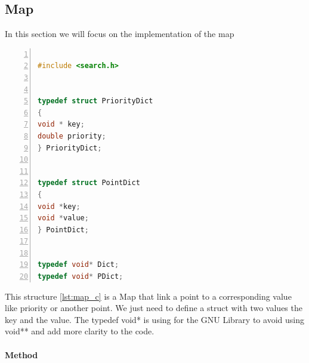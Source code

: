 \subsection{Map}
In this section we will focus on the implementation of the map

\begin{minipage}{\linewidth}
\begin{lstlisting}[language=C, % Spécifie le langage du code
caption={Map C implementation}, % Légende du listing
label=lst:map_c, % Étiquette pour référencer le listing
numbers=left,
numberstyle=\tiny\color{gray},
stepnumber=1,
frame=single,
breaklines=true,
postbreak=\mbox{\textcolor{red}{$\hookrightarrow$}\space},
showstringspaces=false
]

#include <search.h>


typedef struct PriorityDict
{
void * key;
double priority;
} PriorityDict;


typedef struct PointDict
{
void *key;
void *value;
} PointDict;


typedef void* Dict;
typedef void* PDict;

\end{lstlisting}
 
\end{minipage}

This structure \ref{lst:map_c} is a Map that link a point to a corresponding value like priority or another point. We just need to define a struct with two values the key and the value. The typedef void* is using for the GNU Library to avoid using void** and add more clarity to the code.

\paragraph{Method}

